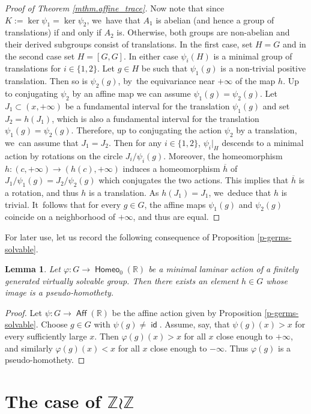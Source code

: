 \documentclass[JEP,XML,SOM,Unicode,NoFloatCountersInSection,published]{cedram}
\newtheorem{lem}[thm]{Lemma}
\theoremstyle{definition}
\DeclareMathOperator{\Aff}{\mathsf{Aff}}
\DeclareMathOperator{\homeo}{\mathsf{Homeo}}
\DeclareMathOperator{\id}{\mathsf{id}}
\newcommand{\R}{\mathbb{R}}
\newcommand{\Z}{\mathbb Z}
\begin{document}
\begin{proof}[Proof of Theorem \ref{mthm.affine_trace}]
Now note that since $K:=\ker \psi_1=\ker \psi_2$, we~have that $A_1$ is abelian (and hence a group of translations) if and only if $A_2$ is. Otherwise, both groups are non-abelian and their derived subgroups consist of translations. In the first case, set $H=G$ and in the second case set $H=[G, G]$. In either case $\psi_i(H)$ is a minimal group of translations for $i\in\{1, 2\}$.
Let $g\in H$ be such that $\psi_1(g)$ is a non-trivial positive translation. Then so is $\psi_2(g)$, by~the equivariance near $+\infty$ of the map $h$. Up to conjugating $\psi_2$ by an affine map we can assume $\psi_1(g)=\psi_2(g)$. Let $J_1\subset (x,+\infty)$ be a fundamental interval for the translation $\psi_1(g)$ and set $J_2=h(J_1)$, which is also a fundamental interval for the translation $\psi_1(g)=\psi_2(g)$. Therefore, up to conjugating the action $\psi_2$ by a translation, we~can assume that $J_1=J_2$. Then for any $i\in \{1,2\}$, $\psi_i|_H$ descends to a minimal action by rotations on the circle $J_i/\psi_i(g)$. Moreover, the homeomorphism $h\colon (c,+\infty)\to (h(c),+\infty)$ induces a homeomorphism $\overline h$ of $J_1/\psi_1(g)=J_2/\psi_2(g)$ which conjugates the two actions. This implies that $\overline h$ is a rotation, and thus $h$ is a translation. As $h(J_1)=J_1$, we~deduce that $h$ is trivial. It~follows that for every $g\in G$, the affine maps $\psi_1(g)$ and $\psi_2(g)$ coincide on a neighborhood of $+\infty$, and thus are equal.
\end{proof}

For later use, let us record the following consequence of Proposition \ref{p-germs-solvable}.
\begin{lem} \label{l-pseudohomtothety-exist}
Let $\varphi\colon G\to \homeo_0(\R)$ be a minimal laminar action of a finitely generated virtually solvable group. Then there exists an element $h\in G$ whose image is a pseudo-homothety.
\end{lem}
\begin{proof}
Let $\psi\colon G\to \Aff(\R)$ be the affine action given by Proposition \ref{p-germs-solvable}. Choose $g\in G$ with $\psi(g)\neq \id$. Assume, say, that $\psi(g)(x)>x$ for every sufficiently large $x$. Then $\varphi(g)(x)>x$ for all $x$ close enough to $+\infty$, and similarly $\varphi(g)(x)<x$ for all $x$ close enough to $-\infty$. Thus $\varphi(g)$ is a pseudo-homothety.
\end{proof}

\section{The case of \texorpdfstring{$\Z\wr \Z$}{Z}}\label{ssc.Plante}
\end{document}
